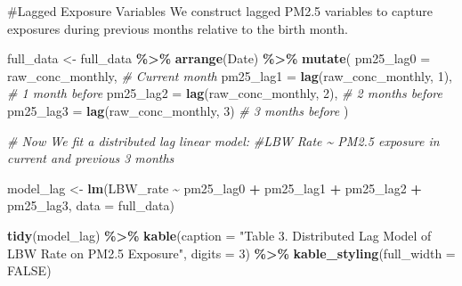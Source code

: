 \documentclass[
]{article}
\newenvironment{Shaded}{\begin{snugshade}}{\end{snugshade}}
\newcommand{\AttributeTok}[1]{\textcolor[rgb]{0.13,0.29,0.53}{#1}}
\newcommand{\CommentTok}[1]{\textcolor[rgb]{0.56,0.35,0.01}{\textit{#1}}}
\newcommand{\ConstantTok}[1]{\textcolor[rgb]{0.56,0.35,0.01}{#1}}
\newcommand{\DecValTok}[1]{\textcolor[rgb]{0.00,0.00,0.81}{#1}}
\newcommand{\FunctionTok}[1]{\textcolor[rgb]{0.13,0.29,0.53}{\textbf{#1}}}
\newcommand{\NormalTok}[1]{#1}
\newcommand{\OtherTok}[1]{\textcolor[rgb]{0.56,0.35,0.01}{#1}}
\newcommand{\SpecialCharTok}[1]{\textcolor[rgb]{0.81,0.36,0.00}{\textbf{#1}}}
\newcommand{\StringTok}[1]{\textcolor[rgb]{0.31,0.60,0.02}{#1}}
\begin{document}
\begin{verbatim}
\end{verbatim}

\#Lagged Exposure Variables We construct lagged PM2.5 variables to
capture exposures during previous months relative to the birth month.

\begin{Shaded}
\begin{Highlighting}[]
\NormalTok{full\_data }\OtherTok{\textless{}{-}}\NormalTok{ full\_data }\SpecialCharTok{\%\textgreater{}\%}
  \FunctionTok{arrange}\NormalTok{(Date) }\SpecialCharTok{\%\textgreater{}\%}
  \FunctionTok{mutate}\NormalTok{(}
    \AttributeTok{pm25\_lag0 =}\NormalTok{ raw\_conc\_monthly,            }\CommentTok{\# Current month}
    \AttributeTok{pm25\_lag1 =} \FunctionTok{lag}\NormalTok{(raw\_conc\_monthly, }\DecValTok{1}\NormalTok{),     }\CommentTok{\# 1 month before}
    \AttributeTok{pm25\_lag2 =} \FunctionTok{lag}\NormalTok{(raw\_conc\_monthly, }\DecValTok{2}\NormalTok{),     }\CommentTok{\# 2 months before}
    \AttributeTok{pm25\_lag3 =} \FunctionTok{lag}\NormalTok{(raw\_conc\_monthly, }\DecValTok{3}\NormalTok{)      }\CommentTok{\# 3 months before}
\NormalTok{  )}
\end{Highlighting}
\end{Shaded}

\begin{Shaded}
\begin{Highlighting}[]
\CommentTok{\# Now We fit a distributed lag linear model:}
\CommentTok{\#LBW Rate \textasciitilde{} PM2.5 exposure in current and previous 3 months}

\NormalTok{model\_lag }\OtherTok{\textless{}{-}} \FunctionTok{lm}\NormalTok{(LBW\_rate }\SpecialCharTok{\textasciitilde{}}\NormalTok{ pm25\_lag0 }\SpecialCharTok{+}\NormalTok{ pm25\_lag1 }\SpecialCharTok{+}\NormalTok{ pm25\_lag2 }\SpecialCharTok{+}\NormalTok{ pm25\_lag3, }\AttributeTok{data =}\NormalTok{ full\_data)}

\FunctionTok{tidy}\NormalTok{(model\_lag) }\SpecialCharTok{\%\textgreater{}\%}
  \FunctionTok{kable}\NormalTok{(}\AttributeTok{caption =} \StringTok{"Table 3. Distributed Lag Model of LBW Rate on PM2.5 Exposure"}\NormalTok{, }\AttributeTok{digits =} \DecValTok{3}\NormalTok{) }\SpecialCharTok{\%\textgreater{}\%}
  \FunctionTok{kable\_styling}\NormalTok{(}\AttributeTok{full\_width =} \ConstantTok{FALSE}\NormalTok{)}
\end{Highlighting}
\end{Shaded}
\end{document}
